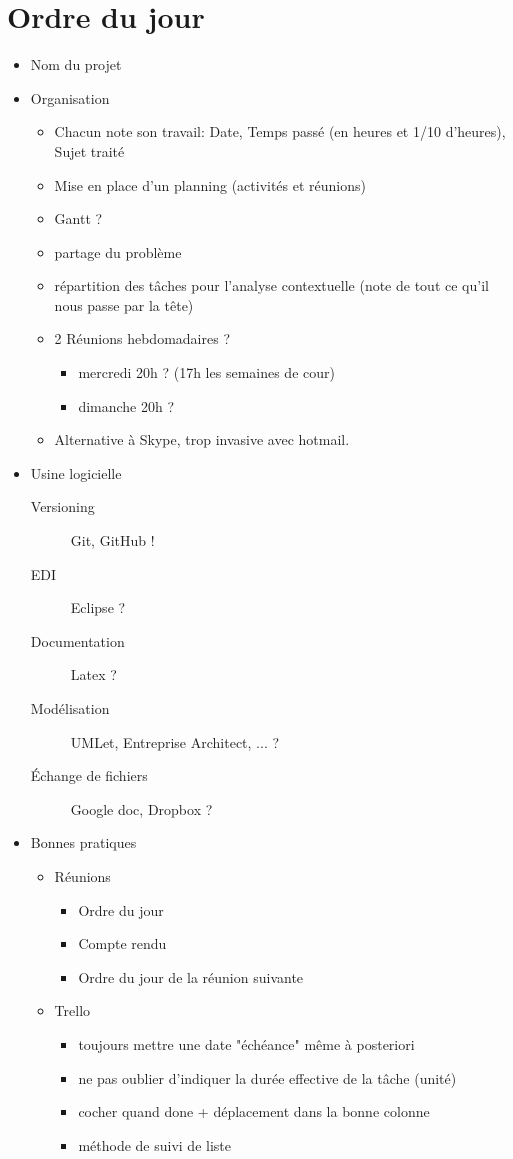 \documentclass[11pt,a4paper,french,twoside,openright]{article}
\begin{document}
\section{Ordre du jour}
\begin{itemize}
\item Nom du projet
\item Organisation
  \begin{itemize}
  \item Chacun note son travail: Date, Temps passé (en heures et 1/10 d'heures), Sujet traité
  \item Mise en place d'un planning (activités et réunions)
  \item Gantt ?
  \item partage du problème
  \item répartition des tâches pour l'analyse contextuelle (note de tout ce qu'il nous passe par la tête)
  \item 2 Réunions hebdomadaires ?
    \begin{itemize}
    \item mercredi 20h ? (17h les semaines de cour)
    \item dimanche 20h ?
    \end{itemize}
  \item Alternative à Skype, trop invasive avec hotmail.
  \end{itemize}
\item Usine logicielle
  \begin{description}
  \item[Versioning] Git, GitHub !
  \item[EDI] Eclipse ?
  \item[Documentation] Latex ?
  \item[Modélisation] UMLet, Entreprise Architect, ... ?
  \item[Échange de fichiers] Google doc, Dropbox ?
  \end{description}
\item Bonnes pratiques
  \begin{itemize}
  \item Réunions
    \begin{itemize}
    \item Ordre du jour
    \item Compte rendu
    \item Ordre du jour de la réunion suivante
    \end{itemize}
  \item Trello
    \begin{itemize}
    \item toujours mettre une date "échéance" même à posteriori
    \item ne pas oublier d'indiquer la durée effective de la tâche (unité)
    \item cocher quand done + déplacement dans la bonne colonne
    \item méthode de suivi de liste
    \end{itemize}
  \end{itemize}
\end{itemize}
\end{document}
